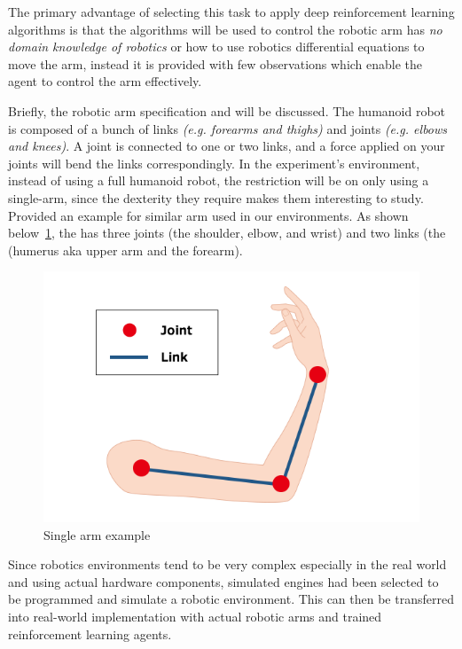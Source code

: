 The primary advantage of selecting this task to apply deep reinforcement learning algorithms is that the algorithms will be used to control the robotic arm has \textit{no domain knowledge of robotics} or how to use robotics differential equations to move the arm, instead it is provided with few observations which enable the agent to control the arm effectively. 

Briefly, the robotic arm specification and will be discussed. The humanoid robot is composed of a bunch of links \textit{(e.g. forearms and thighs)} and joints \textit{ (e.g. elbows and knees)}. A joint is connected to one or two links, and a force applied on your joints will bend the links correspondingly. In the experiment's environment, instead of using a full humanoid robot, the restriction will be on only using a single-arm, since the dexterity they require makes them interesting to study. 
Provided an example for similar arm used in our environments. As shown below~\ref{fig:arm}, the has three joints (the shoulder, elbow, and wrist) and two links (the (humerus aka upper arm and the forearm).

\begin{figure}[!htb]
		\centering
		\includegraphics[width=\linewidth]{figures/arm.png}
		\caption{Single arm example}
		\label{fig:arm}
\end{figure}

Since robotics environments tend to be very complex especially in the real world and using actual hardware components, simulated engines had been selected to be programmed and simulate a robotic environment. This can then be transferred into real-world implementation with actual robotic arms and trained reinforcement learning agents. 

